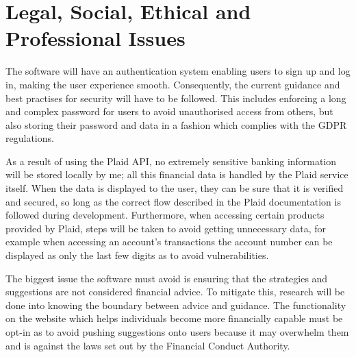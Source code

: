 \section{Legal, Social, Ethical and Professional Issues}
The software will have an authentication system enabling users to sign up and log in, making the user experience smooth. Consequently, the current guidance and best practises for security will have to be followed. This includes enforcing a long and complex password for users to avoid unauthorised access from others, but also storing their password and data in a fashion which complies with the GDPR regulations.

As a result of using the Plaid API, no extremely sensitive banking information will be stored locally by me; all this financial data is handled by the Plaid service itself. When the data is displayed to the user, they can be sure that it is verified and secured, so long as the correct flow described in the Plaid documentation is followed during development. Furthermore, when accessing certain products provided by Plaid, steps will be taken to avoid getting unnecessary data, for example when accessing an account's transactions the account number can be displayed as only the last few digits as to avoid vulnerabilities.

The biggest issue the software must avoid is ensuring that the strategies and suggestions are not considered financial advice. To mitigate this, research will be done into knowing the boundary between advice and guidance. The functionality on the website which helps individuals become more financially capable must be opt-in as to avoid pushing suggestions onto users because it may overwhelm them and is against the laws set out by the Financial Conduct Authority.